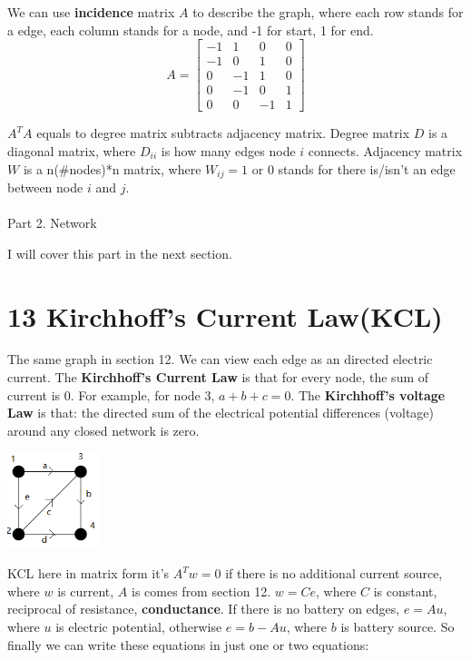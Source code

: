 \documentclass{article}
\begin{document}
\begin{spacing}{1.5}
We can use {\bfseries incidence} matrix $A$ to describe the graph, where each row stands for a edge, each column stands for a node, and -1 for start, 1 for end.
$$
A=
\begin{bmatrix}
-1 & 1 & 0 & 0 \\
-1 & 0 & 1 & 0 \\
0 & -1 & 1 & 0 \\
0 & -1 & 0 & 1 \\
0 & 0 & -1 & 1
\end{bmatrix}
$$

$A^TA$ equals to degree matrix subtracts adjacency matrix. Degree matrix $D$ is a diagonal matrix, where $D_{ii}$ is how many edges node $i$ connects. Adjacency matrix $W$ is a n($\#$nodes)*n matrix, where $W_{ij}= 1$ or 0 stands for there is/isn't an edge between node $i$ and $j$.
\\\\Part 2. Network

I will cover this part in the next section.


\section*{13 Kirchhoff's Current Law(KCL)}
\hspace*{0.5cm}The same graph in section 12. We can view each edge as an directed electric current. The {\bfseries Kirchhoff's Current Law} is that for every node, the sum of current is 0. For example, for node 3, $a+b+c=0$. The {\bfseries Kirchhoff's voltage Law} is that: the directed sum of the electrical potential differences (voltage) around any closed network is zero. 
\\\begin{center}
	\includegraphics[width=0.2\textwidth]{four_nodes_five_edges_current.png}
\end{center}

KCL here in matrix form it's $A^Tw=0$ if there is no additional current source, where $w$ is current, $A$ is comes from section 12. $w=Ce$, where $C$ is constant, reciprocal of resistance, {\bfseries conductance}. If there is no battery on edges, $e=Au$, where $u$ is electric potential, otherwise $e=b-Au$, where $b$ is battery source. So finally we can write these equations in just one or two equations:


\end{spacing}
\end{document}
